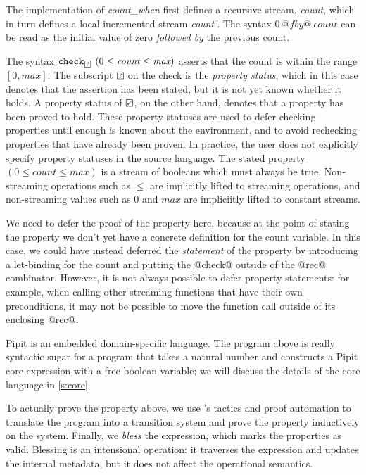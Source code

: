 The implementation of \emph{count_when} first defines a recursive stream, \emph{count}, which in turn defines a local incremented stream \emph{count'}.
The syntax $0~@fby@~\textit{count}$ can be read as the initial value of zero \emph{followed by} the previous count.

The syntax $\xcheckP{\PSUnknown}{(0 \le \textit{count} \le \textit{max})}$ asserts that the count is within the range $[0, \textit{max}]$.
The subscript $\PSUnknown$ on the check is the \emph{property status}, which in this case denotes that the assertion has been stated, but it is not yet known whether it holds.
A property status of $\PSValid$, on the other hand, denotes that a property has been proved to hold.
These property statuses are used to defer checking properties until enough is known about the environment, and to avoid rechecking properties that have already been proven.
In practice, the user does not explicitly specify property statuses in the source language.
The stated property $(0 \le \textit{count} \le \textit{max})$ is a stream of booleans which must always be true.
Non-streaming operations such as $\le$ are implicitly lifted to streaming operations, and non-streaming values such as $0$ and $\textit{max}$ are impliciitly lifted to constant streams.

We need to defer the proof of the property here, because at the point of stating the property we don't yet have a concrete definition for the count variable.
In this case, we could have instead deferred the \emph{statement} of the property by introducing a let-binding for the count and putting the @check@ outside of the @rec@ combinator.
However, it is not always possible to defer property statements: for example, when calling other streaming functions that have their own preconditions, it may not be possible to move the function call outside of its enclosing @rec@.



Pipit is an embedded domain-specific language. %
The program above is really syntactic sugar for a \fstar{} program that takes a natural number and constructs a Pipit core expression with a free boolean variable; we will discuss the details of the core language in \autoref{s:core}.

To actually prove the property above, we use \fstar{}'s tactics and proof automation to translate the program into a transition system and prove the property inductively on the system.
Finally, we \emph{bless} the expression, which marks the properties as valid.
Blessing is an intensional operation: it traverses the expression and updates the internal metadata, but it does not affect the operational semantics.

